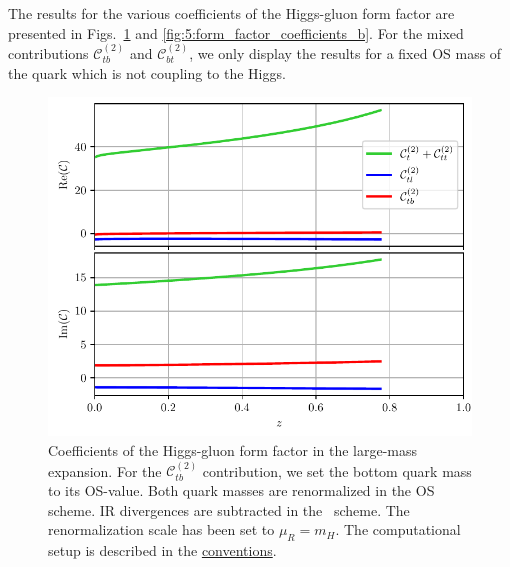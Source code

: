 The results for the various coefficients of the Higgs-gluon form factor are presented in Figs.~\ref{fig:5:form_factor_coefficients_t} and \ref{fig:5:form_factor_coefficients_b}. For the mixed contributions $\mathcal{C}^{(2)}_{tb}$ and $\mathcal{C}^{(2)}_{bt}$, we only display the results for a fixed \acs{OS} mass of the quark which is not coupling to the Higgs.
\begin{figure}[h]
\centering
\includegraphics[width=\figurewidth]{Images/form_factor_coefficients_t.pdf}
\caption{Coefficients of the Higgs-gluon form factor in the large-mass expansion. For the $\mathcal{C}_{tb}^{(2)}$ contribution, we set the bottom quark mass to its \acs{OS}-value. Both quark masses are renormalized in the \acs{OS} scheme. \acs{IR} divergences are subtracted in the \MS\ scheme. The renormalization scale has been set to $\mu_R = m_H$. The computational setup is described in the \hyperref[chap:notation_and_conventions]{conventions}.}
\label{fig:5:form_factor_coefficients_t}
\end{figure}
